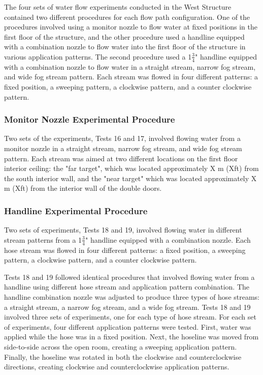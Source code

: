\documentclass[12pt,oneside]{book}
\begin{document}
\clearpage

The four sets of water flow experiments conducted in the West Structure contained two different procedures for each flow path configuration. One of the procedures involved using a monitor nozzle to flow water at fixed positions in the first floor of the structure, and the other procedure used a handline equipped with a combination nozzle to flow water into the first floor of the structure in various application patterns.  The second procedure used a 1$\frac{3}{4}$" handline equipped with a combination nozzle to flow water in a straight stream, narrow fog stream, and wide fog stream pattern. Each stream was flowed in four different patterns: a fixed position, a sweeping pattern, a clockwise pattern, and a counter clockwise pattern.

\subsubsection{Monitor Nozzle Experimental Procedure}
\label{sec:Monitor_Procedure}
Two sets of the experiments, Tests 16 and 17, involved flowing water from a monitor nozzle in a straight stream, narrow fog stream, and wide fog stream pattern. Each stream was aimed at two different locations on the first floor interior ceiling: the "far target", which was located approximately X m (Xft) from the south interior wall, and the "near target" which was located approximately X m (Xft) from the interior wall of the double doors.

\subsubsection{Handline Experimental Procedure}
\label{sec:Handline_Procedure}
Two sets of experiments, Tests 18 and 19, involved flowing water in different stream patterns from a 1$\frac{3}{4}$" handline equipped with a combination nozzle. Each hose stream was flowed in four different patterns: a fixed position, a sweeping pattern, a clockwise pattern, and a counter clockwise pattern.

Tests 18 and 19 followed identical procedures that involved flowing water from a handline using different hose stream and application pattern combination.  The handline combination nozzle was adjusted to produce three types of hose streams: a straight stream, a narrow fog stream, and a wide fog stream. Tests 18 and 19 involved three sets of experiments, one for each type of hose stream. For each set of experiments, four different application patterns were tested. First, water was applied while the hose was in a fixed position. Next, the hoseline was moved from side-to-side across the open room, creating a sweeping application pattern. Finally, the hoseline was rotated in both the clockwise and counterclockwise directions, creating clockwise and counterclockwise application patterns. 
\end{document}
